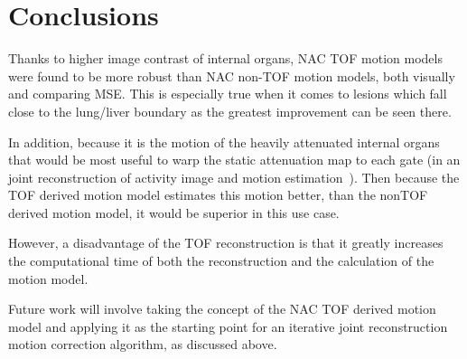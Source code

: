 \documentclass[journal]{IEEEtran}
\begin{document}
%

\section{Conclusions}
Thanks to higher image contrast of internal organs, NAC TOF motion models were found to be more robust than NAC non-TOF motion models, both visually and comparing MSE. This is especially true when it comes to lesions which fall close to the lung/liver boundary as the greatest improvement can be seen there.

In addition, because it is the motion of the heavily attenuated internal organs that would be most useful to warp the static attenuation map to each gate (in an joint reconstruction of activity image and motion estimation~\cite{Bousse2016a}). Then because the TOF derived motion model estimates this motion better, than the nonTOF derived motion model, it would be superior in this use case.

However, a disadvantage of the TOF reconstruction is that it greatly increases the computational time of both the reconstruction and the calculation of the motion model.

Future work will involve taking the concept of the NAC TOF derived motion model and applying it as the starting point for an iterative joint reconstruction motion correction algorithm, as discussed above.
\end{document}
